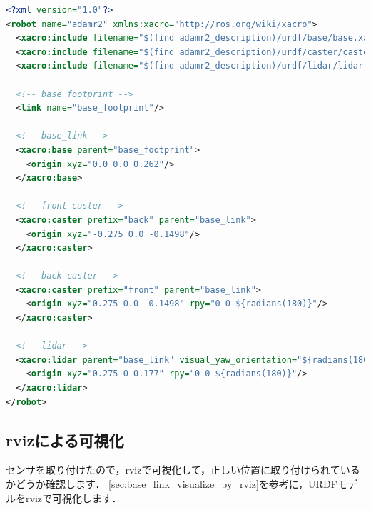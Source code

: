 \documentclass[{../../master}]{subfiles}
\begin{document}
\begin{lstlisting}[language=XML, label=code:robot_xacro_add_lidar_link, caption=Add \textsf{lidar\_link} to Robot Model]
<?xml version="1.0"?>
<robot name="adamr2" xmlns:xacro="http://ros.org/wiki/xacro">
  <xacro:include filename="$(find adamr2_description)/urdf/base/base.xacro"/>
  <xacro:include filename="$(find adamr2_description)/urdf/caster/caster.xacro"/>
  <xacro:include filename="$(find adamr2_description)/urdf/lidar/lidar.xacro"/>

  <!-- base_footprint -->
  <link name="base_footprint"/>

  <!-- base_link -->
  <xacro:base parent="base_footprint">
    <origin xyz="0.0 0.0 0.262"/>
  </xacro:base>

  <!-- front caster -->
  <xacro:caster prefix="back" parent="base_link">
    <origin xyz="-0.275 0.0 -0.1498"/>
  </xacro:caster>

  <!-- back caster -->
  <xacro:caster prefix="front" parent="base_link">
    <origin xyz="0.275 0.0 -0.1498" rpy="0 0 ${radians(180)}"/>
  </xacro:caster>

  <!-- lidar -->
  <xacro:lidar parent="base_link" visual_yaw_orientation="${radians(180)}">
    <origin xyz="0.275 0 0.177" rpy="0 0 ${radians(180)}"/>
  </xacro:lidar>
</robot>
\end{lstlisting}

\subsection{\textsf{rviz}による可視化}

センサを取り付けたので，\textsf{rviz}で可視化して，正しい位置に取り付けられているかどうか確認します．
\ref{sec:base_link_visualize_by_rviz}を参考に，URDFモデルを\textsf{rviz}で可視化します．
\end{document}

